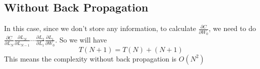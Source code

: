 \documentclass[12pt]{article}
\begin{document}
\subsection*{Without Back Propagation}
In this case, since we don't store any information, to calculate $\frac{\partial C}{\partial W_0}$, we need to do $\frac{\partial C}{\partial L_N}\frac{\partial L_N}{\partial L_{N-1}}\cdots \frac{\partial L_2}{\partial L_1}\frac{\partial L_1}{\partial W_0}$. So we will have
\[
    T(N+1) = T(N) + (N + 1)
\]
This means the complexity without back propagation is $O(N^2)$

\end{document}
